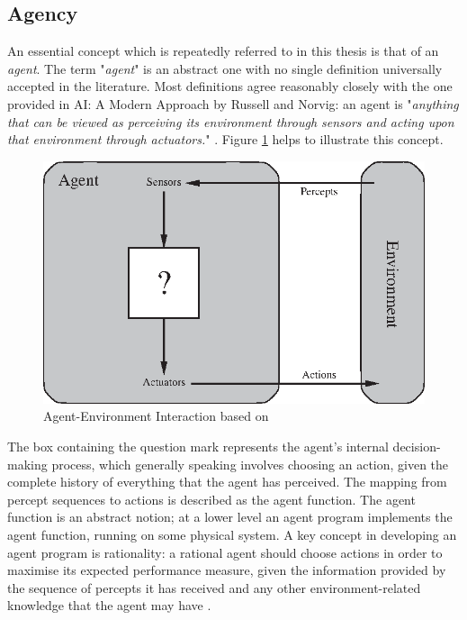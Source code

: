 
\subsection{Agency} \label{AgencySubsection}
An essential concept which is repeatedly referred to in this thesis is that of an \emph{agent}. The term "\textit{agent}" is an abstract one with no single definition universally accepted in the literature. Most definitions agree reasonably closely with the one provided in AI: A Modern Approach by Russell and Norvig: an agent is "\textit{anything that can be viewed as perceiving its environment through sensors and acting upon that environment through actuators.}" \cite[p.~34]{AIAMA}. Figure \ref{fig:agent_env_interaction} helps to illustrate this concept. 
\begin{figure}
    \centering
    \includegraphics{Chapters/BackgroundKnowledgeAndRelatedWork/Figs/Vector/agent-environment.eps}
    \caption{Agent-Environment Interaction based on \cite[p.~35]{AIAMA}}
    \label{fig:agent_env_interaction}
\end{figure}
The box containing the question mark represents the agent's internal decision-making process, which generally speaking involves choosing an action, given the complete history of everything that the agent has perceived. The mapping from percept sequences to actions is described as the agent function. The agent function is an abstract notion; at a lower level an agent program implements the agent function, running on some physical system. A key concept in developing an agent program is rationality: a rational agent should choose actions in order to maximise its expected performance measure, given the information provided by the sequence of percepts it has received and any other environment-related knowledge that the agent may have \cite[p.~37]{AIAMA}.
